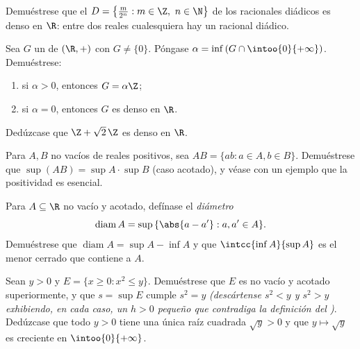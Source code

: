 \begin{exercise}[$\star\star$]\label{exo:b1:reals:8}
Demuéstrese que el  $D = \bigl\{\frac{m}{2^n} : m \in \Z,\ n \in
\N\bigr\}$ de los racionales diádicos es denso en $\R$: entre dos
reales cualesquiera hay un racional diádico.
\end{exercise}

\begin{exercise}[$\star\star\star$]\label{exo:b1:reals:9}
Sea $G$ un  de $(\R, +)$ con $G \neq \{0\}$. Póngase
$\alpha = \inf\,(G \cap \intoo{0}{+\infty})$. Demuéstrese:
\begin{enumerate}
  \item si $\alpha > 0$, entonces $G = \alpha\Z$;
  \item si $\alpha = 0$, entonces $G$ es denso en $\R$.
\end{enumerate}
Dedúzcase que $\Z + \sqrt 2\,\Z$ es denso en $\R$.
\end{exercise}

\begin{exercise}[$\star\star\star$]\label{exo:b1:reals:10}
Para $A, B$  no vacíos de reales positivos, sea
$AB = \{ab : a \in A, b \in B\}$. Demuéstrese que
$\sup(AB) = \sup A \cdot \sup B$ (caso acotado), y véase con un ejemplo
que la positividad es esencial.
\end{exercise}

\begin{exercise}[$\star\star$]\label{exo:b1:reals:11}
Para $A \subseteq \R$ no vacío y acotado, defínase el
\emph{diámetro}
\[
\operatorname{diam} A = \sup\,\{\abs{a - a'} : a, a' \in A\} .
\]
Demuéstrese que $\operatorname{diam} A = \sup A - \inf A$ y que
$\intcc{\inf A}{\sup A}$ es el menor  cerrado que contiene
a $A$.
\end{exercise}

\begin{exercise}[$\star\star\star$]\label{exo:b1:reals:12}
Sean $y > 0$ y $E = \{x \geq 0 : x^2 \leq y\}$. Demuéstrese que $E$ es
no vacío y acotado superiormente, y que $s = \sup E$ cumple $s^2 = y$
\emph{(descártense $s^2 < y$ y $s^2 > y$ exhibiendo, en cada caso, un
$h > 0$ pequeño que contradiga la definición del )}. Dedúzcase
que todo $y > 0$ tiene una única raíz cuadrada $\sqrt y > 0$ y que
$y \mapsto \sqrt y$ es creciente en $\intoo{0}{+\infty}$.
\end{exercise}

